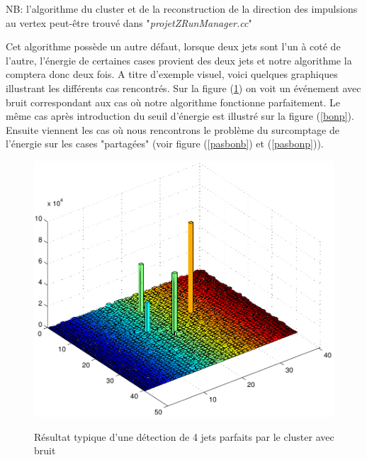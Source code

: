 \documentclass[11pt]{article}
\begin{document}
NB: l'algorithme du cluster et de la reconstruction de la direction des
impulsions au vertex peut-être trouvé dans "\textit{projetZRunManager.cc}"

Cet algorithme possède un autre défaut, lorsque deux jets sont l'un à coté de
l'autre, l'énergie de certaines cases provient des deux jets et notre
algorithme la comptera donc deux fois. A titre d'exemple visuel, voici quelques
graphiques illustrant les différents cas rencontrés. Sur la figure (\ref{bonb})
on voit un événement avec bruit correspondant aux cas où notre algorithme
fonctionne parfaitement. Le même cas après introduction du seuil d'énergie est
illustré sur la figure (\ref{bonp}). Ensuite viennent les cas où nous
rencontrons le problème du surcomptage de l'énergie sur les cases "partagées"
(voir figure (\ref{pasbonb}) et (\ref{pasbonp})).
\begin{figure}
\caption{Résultat typique d'une détection de 4 jets parfaits par le cluster avec bruit}
\includegraphics[scale=0.55]{images/bonCasBrut-eps-converted-to.pdf}
\label{bonb}
\end{figure}
\end{document}
